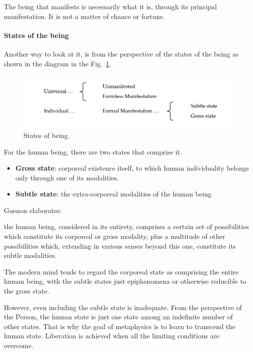 The being that manifests is necessarily what it is, through its principal manifestation. It is not a matter of chance or fortune.

\paragraph{States of the being}
Another way to look at it, is from the perspective of the states of the being as shown in the diagram in the Fig.~\ref{fig:SacredScience102c}.

\begin{figure}[t]
\centering
\includegraphics[scale=0.25]{a20220922SacredScience102TheSelfandtheEgo-img003.png} 
\caption{States of being.}
\label{fig:SacredScience102c}
\end{figure}

For the human being, there are two states that comprise it.

\begin{itemize}
\item \textbf{Gross state}: corporeal existence itself, to which human individuality belongs only through one of its modalities. 
\item \textbf{Subtle state}: the extra-corporeal modalities of the human being 
\end{itemize}
Guenon elaborates:

\begin{quotex}
the human being, considered in its entirety, comprises a certain set of possibilities which constitute its corporeal or gross modality, plus a multitude of other possibilities which, extending in various senses beyond this one, constitute its subtle modalities.

\end{quotex}
The modern mind tends to regard the corporeal state as comprising the entire human being, with the subtle states just epiphenomena or otherwise reducible to the gross state.

However, even including the subtle state is inadequate. From the perspective of the Person, the human state is just one state among an indefinite number of other states. That is why the goal of metaphysics is to learn to transcend the human state. Liberation is achieved when all the limiting conditions are overcome.

